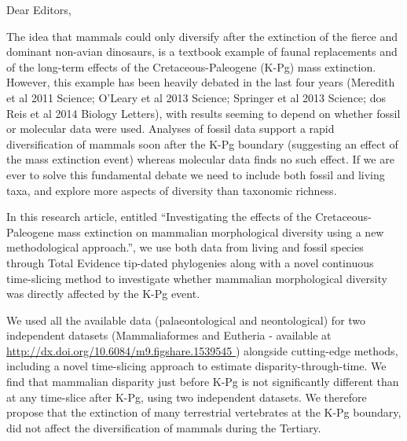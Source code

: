 \documentclass[11pt]{letter}
\begin{document}
\begin{letter}{}
\opening{Dear Editors,}

The idea that mammals could only diversify after the extinction of the fierce and dominant non-avian dinosaurs, is a textbook example of faunal replacements and of the long-term effects of the Cretaceous-Paleogene (K-Pg) mass extinction.
However, this example has been heavily debated in the last four years (Meredith et al 2011 Science; O'Leary et al 2013 Science; Springer et al 2013 Science; dos Reis et al 2014 Biology Letters), with results seeming to depend on whether fossil or molecular data were used.
Analyses of fossil data support a rapid diversification of mammals soon after the K-Pg boundary (suggesting an effect of the mass extinction event) whereas molecular data finds no such effect.
If we are ever to solve this fundamental debate we need to include both fossil and living taxa, and explore more aspects of diversity than taxonomic richness.

In this research article, entitled ``Investigating the effects of the Cretaceous-Paleogene mass extinction on mammalian morphological diversity using a new methodological approach.'', we use both data from living and fossil species through Total Evidence tip-dated phylogenies along with a novel continuous time-slicing method to investigate whether mammalian morphological diversity was directly affected by the K-Pg event.

We used all the available data (palaeontological and neontological) for two independent datasets (Mammaliaformes and Eutheria - available at \url{http://dx.doi.org/10.6084/m9.figshare.1539545
}) alongside cutting-edge methods, including a novel time-slicing approach to estimate disparity-through-time.
We find that mammalian disparity just before K-Pg is not significantly different than at any time-slice after K-Pg, using two independent datasets.
We therefore propose that the extinction of many terrestrial vertebrates at the K-Pg boundary, did not affect the diversification of mammals during the Tertiary. 



\end{letter}
\end{document}
